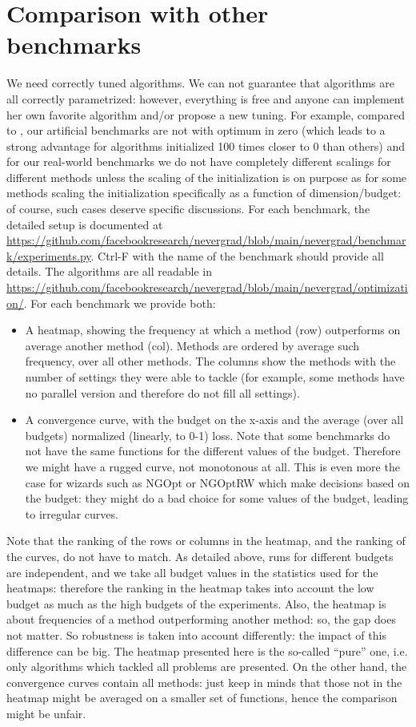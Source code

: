 \documentclass{article}
\begin{document}
\section{Comparison with other benchmarks}
We need correctly tuned algorithms. We can not guarantee that algorithms are all correctly parametrized: however, everything is free and anyone can implement her own favorite algorithm and/or propose a new tuning. For example, compared to \cite{lamcts}, our artificial benchmarks are not with optimum in zero (which leads to a strong advantage for algorithms initialized 100 times closer to 0 than others) and for our real-world benchmarks we do not have completely different scalings for different methods unless the scaling of the initialization is on purpose as for some methods scaling the initialization specifically as a function of dimension/budget: of course, such cases deserve specific discussions.
For each benchmark, the detailed setup is documented at \url{https://github.com/facebookresearch/nevergrad/blob/main/nevergrad/benchmark/experiments.py}.
Ctrl-F with the name of the benchmark should provide all details.
The algorithms are all readable in  \url{https://github.com/facebookresearch/nevergrad/blob/main/nevergrad/optimization/}.
For each benchmark we provide both:
\begin{itemize}
\item A heatmap, showing the frequency at which a method (row) outperforms on average another method (col). Methods are ordered by average such frequency, over all other methods.
The columns show the methods with the number of settings they were able to tackle (for example, some methods have no parallel version and therefore do not fill all settings).
\item A convergence curve, with the budget on the x-axis and the average (over all budgets) normalized (linearly, to
0-1) loss. Note that some benchmarks do not have the same functions for the different values of the budget. Therefore we
might have a rugged curve, not monotonous at all. This is even more the case for wizards such as NGOpt or NGOptRW which
make decisions based on the budget: they might do a bad choice for some values of the budget, leading to irregular
curves.
\end{itemize}
Note that the ranking of the rows or columns in the heatmap, and the ranking of the curves, do not have to match. As
detailed above, runs for different budgets are independent, and we take all budget values in the statistics used for the
heatmaps: therefore the ranking in the heatmap takes into account the low budget as much as the high budgets of the
experiments. Also, the heatmap is about frequencies of a method outperforming another method: so, the gap does not
matter. So robustness is taken into account differently: the impact of this difference can be big.
The heatmap presented here is the so-called ``pure'' one, i.e. only algorithms which tackled all problems are presented.
On the other hand, the convergence curves contain all methods: just keep in minds that those not in the heatmap might be
averaged on a smaller set of functions, hence the comparison might be unfair.
\end{document}
